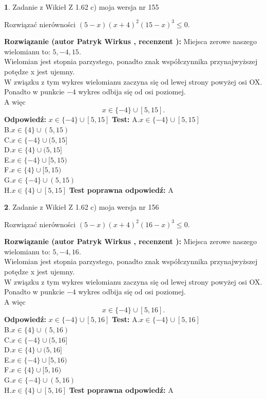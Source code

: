 \documentclass[12pt, a4paper]{article}
\theoremstyle{definition} %
\newtheorem{zad}{}
\newcommand{\zadStart}[1]{\begin{zad}#1\newline}
\newcommand{\zadStop}{\end{zad}}
\newcommand{\rozwStart}[2]{\noindent \textbf{Rozwiązanie (autor #1 , recenzent #2): }\newline}
\newcommand{\rozwStop}{\newline}
\newcommand{\odpStart}{\noindent \textbf{Odpowiedź:}\newline}
\newcommand{\odpStop}{\newline}
\newcommand{\testStart}{\noindent \textbf{Test:}\newline}
\newcommand{\testStop}{\newline}
\newcommand{\kluczStart}{\noindent \textbf{Test poprawna odpowiedź:}\newline}
\newcommand{\kluczStop}{\newline}
\begin{document}
\zadStart{Zadanie z Wikieł Z 1.62 c) moja wersja nr 155}

Rozwiązać nierówności $(5-x)(x+4)^{2}(15-x)^{3}\le0$.
\zadStop
\rozwStart{Patryk Wirkus}{}
Miejsca zerowe naszego wielomianu to: $5, -4, 15$.\\
Wielomian jest stopnia parzystego, ponadto znak współczynnika przy\linebreak najwyższej potędze x jest ujemny.\\ W związku z tym wykres wielomianu zaczyna się od lewej strony powyżej osi OX.\\
Ponadto w punkcie $-4$ wykres odbija się od osi poziomej.\\
A więc $$x \in \{-4\} \cup [5,15].$$
\rozwStop
\odpStart
$x \in \{-4\} \cup [5,15]$
\odpStop
\testStart
A.$x \in \{-4\} \cup [5,15]$\\
B.$x \in \{4\} \cup (5,15)$\\
C.$x \in \{-4\} \cup (5,15]$\\
D.$x \in \{4\} \cup (5,15]$\\
E.$x \in \{-4\} \cup [5,15)$\\
F.$x \in \{4\} \cup [5,15)$\\
G.$x \in \{-4\} \cup (5,15)$\\
H.$x \in \{4\} \cup [5,15]$
\testStop
\kluczStart
A
\kluczStop



\zadStart{Zadanie z Wikieł Z 1.62 c) moja wersja nr 156}

Rozwiązać nierówności $(5-x)(x+4)^{2}(16-x)^{3}\le0$.
\zadStop
\rozwStart{Patryk Wirkus}{}
Miejsca zerowe naszego wielomianu to: $5, -4, 16$.\\
Wielomian jest stopnia parzystego, ponadto znak współczynnika przy\linebreak najwyższej potędze x jest ujemny.\\ W związku z tym wykres wielomianu zaczyna się od lewej strony powyżej osi OX.\\
Ponadto w punkcie $-4$ wykres odbija się od osi poziomej.\\
A więc $$x \in \{-4\} \cup [5,16].$$
\rozwStop
\odpStart
$x \in \{-4\} \cup [5,16]$
\odpStop
\testStart
A.$x \in \{-4\} \cup [5,16]$\\
B.$x \in \{4\} \cup (5,16)$\\
C.$x \in \{-4\} \cup (5,16]$\\
D.$x \in \{4\} \cup (5,16]$\\
E.$x \in \{-4\} \cup [5,16)$\\
F.$x \in \{4\} \cup [5,16)$\\
G.$x \in \{-4\} \cup (5,16)$\\
H.$x \in \{4\} \cup [5,16]$
\testStop
\kluczStart
A
\kluczStop
\end{document}

